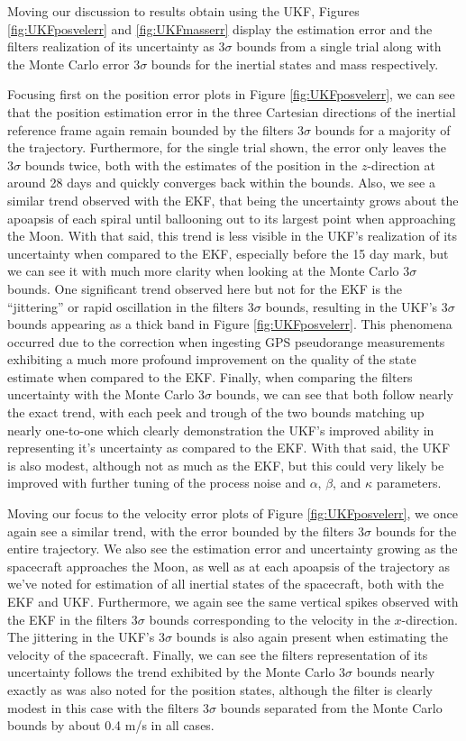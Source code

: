\documentclass[letterpaper, paper,11pt]{AAS}		%
\begin{document}
Moving our discussion to results obtain using the UKF, Figures \ref{fig:UKFposvelerr} and \ref{fig:UKFmasserr} display the estimation error and the filters realization of its uncertainty as $3\sigma$ bounds from a single trial along with the Monte Carlo error $3\sigma$ bounds for the inertial states and mass respectively. 

Focusing first on the position error plots in Figure \ref{fig:UKFposvelerr}, we can see that the position estimation error in the three Cartesian directions of the inertial reference frame again remain bounded by the filters $3\sigma$ bounds for a majority of the trajectory. Furthermore, for the single trial shown, the error only leaves the $3\sigma$ bounds twice, both with the estimates of the position in the $z$-direction at around 28 days and quickly converges back within the bounds. Also, we see a similar trend observed with the EKF, that being the uncertainty grows about the apoapsis of each spiral until ballooning out to its largest point when approaching the Moon. With that said, this trend is less visible in the UKF's realization of its uncertainty when compared to the EKF, especially before the 15 day mark, but we can see it with much more clarity when looking at the Monte Carlo $3\sigma$ bounds. One significant trend observed here but not for the EKF is the ``jittering'' or rapid oscillation in the filters $3\sigma$ bounds, resulting in the UKF's $3\sigma$ bounds appearing as a thick band in Figure \ref{fig:UKFposvelerr}. This phenomena occurred due to the correction when ingesting GPS pseudorange measurements exhibiting a much more profound improvement on the quality of the state estimate when compared to the EKF. Finally, when comparing the filters uncertainty with the Monte Carlo $3\sigma$ bounds, we can see that both follow nearly the exact trend, with each peek and trough of the two bounds matching up nearly one-to-one which clearly demonstration the UKF's improved ability in representing it's uncertainty as compared to the EKF. With that said, the UKF is also modest, although not as much as the EKF, but this could very likely be improved with further tuning of the process noise and $\alpha$, $\beta$, and $\kappa$ parameters. 

Moving our focus to the velocity error plots of Figure \ref{fig:UKFposvelerr}, we once again see a similar trend, with the error bounded by the filters $3\sigma$ bounds for the entire trajectory. We also see the estimation error and uncertainty growing as the spacecraft approaches the Moon, as well as at each apoapsis of the trajectory as we've noted for estimation of all inertial states of the spacecraft, both with the EKF and UKF. Furthermore, we again see the same vertical spikes observed with the EKF in the filters $3\sigma$ bounds corresponding to the velocity in the $x$-direction. The jittering in the UKF's $3\sigma$ bounds is also again present when estimating the velocity of the spacecraft. Finally, we can see the filters representation of its uncertainty follows the trend exhibited by the Monte Carlo $3\sigma$ bounds nearly exactly as was also noted for the position states, although the filter is clearly modest in this case with the filters $3\sigma$ bounds separated from the Monte Carlo bounds by about 0.4 m/s in all cases. 
\end{document}
